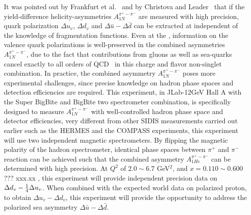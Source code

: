  It was  pointed out by Frankfurt et al.~\cite{Frankfurt} and by Christova and Leader~\cite{Christova:1999he, Christova:2000nz} that 
if the yield-difference  helicity-asymmetries $A_{1N}^{\pi^+ - \pi^-}$ are measured with  high precision,
quark polarization $\Delta u_v$, $\Delta d_v$ and $\Delta \bar{u} - \Delta \bar{d}$ can be extracted
at \lo independent of the knowledge of fragmentation functions.  Even 
at the \nloo, information on the 
valence quark polarizations is well-preserved in the combined 
asymmetries $A_{1N}^{\pi^+ - \pi^-}$, due to the fact that contributions from 
gluons as well as sea-quarks cancel exactly to all orders of QCD~\cite{Christova:2000nz} in this charge and flavor 
non-singlet combination.
In practice, the combined asymmetry $A_{1N}^{\pi^+ - \pi^-}$ poses more
experimental challenges, since precise knowledge on hadron phase spaces and detection 
efficiencies are required. This experiment,  in JLab-12GeV Hall A with the Super BigBite and BigBite two spectrometer combination,  is specifically designed to measure $A_{1N}^{\pi^+ - \pi^-}$ with well-controlled hadron phase space and detector efficiencies,  
 very different from other SIDIS measurements carried out earlier such as  the HERMES and the  COMPASS experiments,
this experiment will use two independent magnetic spectrometers. By flipping the magnetic 
polarity of the hadron spectrometer, identical phase spaces between $\pi^+$ and $\pi^-$ 
reaction can be achieved such that the combined asymmetry $A_{1He}^{\pi^+ - \pi^-}$ can be 
determined with high precision.
At $Q^2$ of $2.0\sim 6.7$ GeV$^2$, and $x=0.110 \sim 0.600$ ??? xxx.xx , this experiment will 
provide independent precision data on $\Delta d_v -{1 \over 4} \Delta u_v$.
When combined with the expected world data on polarized proton, 
to obtain $\Delta u_v - \Delta d_v$,
this experiment will provide the
opportunity to address the polarized sea asymmetry $\Delta \bar{u}- \Delta \bar{d}$. 

